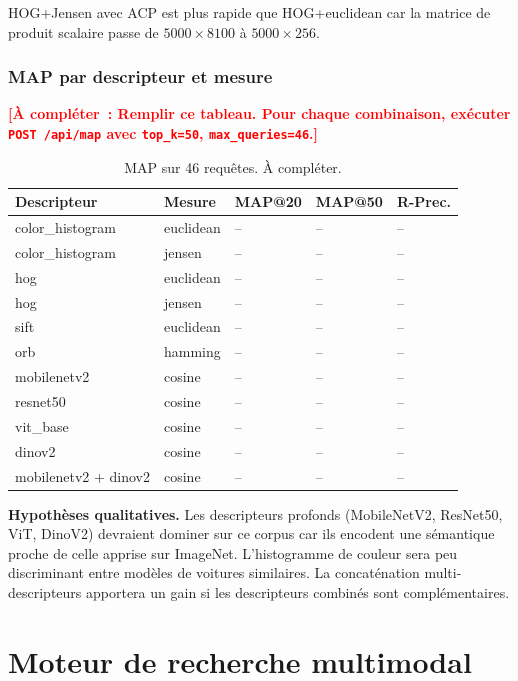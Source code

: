 \documentclass[12pt,a4paper]{report}
\newcommand{\todo}[1]{\textcolor{red}{\textbf{[À compléter~: #1]}}}
\begin{document}
HOG+Jensen avec ACP est plus rapide que HOG+euclidean car la matrice de produit scalaire passe de $5000 \times 8100$ à $5000 \times 256$.

\section{MAP par descripteur et mesure}

\todo{Remplir ce tableau. Pour chaque combinaison, exécuter \texttt{POST /api/map} avec \texttt{top\_k=50}, \texttt{max\_queries=46}.}

\begin{table}[H]
  \centering
  \begin{tabular}{lllll}
    \toprule
    Descripteur & Mesure & MAP@20 & MAP@50 & R-Prec. \\
    \midrule
    color\_histogram & euclidean  & -- & -- & -- \\
    color\_histogram & jensen     & -- & -- & -- \\
    hog              & euclidean  & -- & -- & -- \\
    hog              & jensen     & -- & -- & -- \\
    sift             & euclidean  & -- & -- & -- \\
    orb              & hamming    & -- & -- & -- \\
    mobilenetv2      & cosine     & -- & -- & -- \\
    resnet50         & cosine     & -- & -- & -- \\
    vit\_base        & cosine     & -- & -- & -- \\
    dinov2           & cosine     & -- & -- & -- \\
    mobilenetv2 + dinov2 & cosine & -- & -- & -- \\
    \bottomrule
  \end{tabular}
  \caption{MAP sur 46 requêtes. À compléter.}
\end{table}

\textbf{Hypothèses qualitatives.} Les descripteurs profonds (MobileNetV2, ResNet50, ViT, DinoV2) devraient dominer sur ce corpus car ils encodent une sémantique proche de celle apprise sur ImageNet. L'histogramme de couleur sera peu discriminant entre modèles de voitures similaires. La concaténation multi-descripteurs apportera un gain si les descripteurs combinés sont complémentaires.

\part{Moteur de recherche multimodal}
\end{document}
